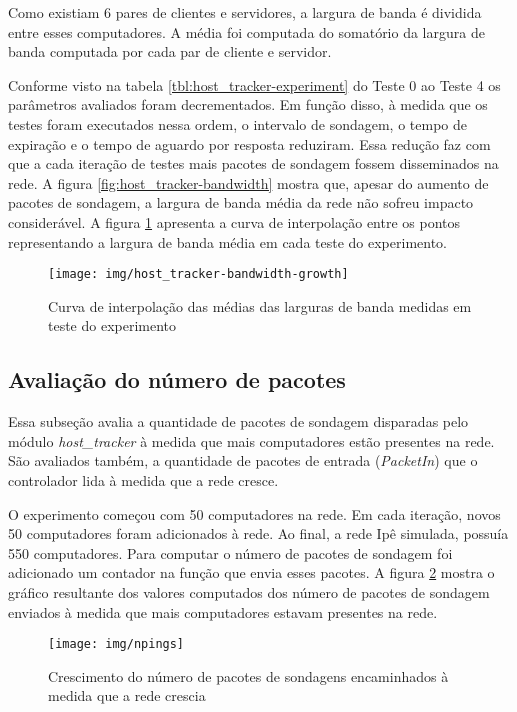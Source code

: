 Como existiam 6 pares de clientes e servidores, a largura de banda é 
dividida entre esses computadores.
A média foi computada do somatório da largura de banda computada por cada 
par de cliente e servidor.

Conforme visto na tabela \ref{tbl:host_tracker-experiment} do Teste 0 ao 
Teste 4 os parâmetros avaliados foram decrementados. 
Em função disso, à medida que os testes foram executados nessa ordem, 
o intervalo de sondagem, o tempo de expiração e o tempo de aguardo por 
resposta reduziram. 
Essa redução faz com que a cada iteração de testes mais pacotes de sondagem
fossem disseminados na rede.
A figura \ref{fig:host_tracker-bandwidth} mostra que, apesar do aumento de 
pacotes de sondagem, a largura de banda média da rede não sofreu impacto 
considerável.
A figura \ref{fig:host_tracker-bandwidth-growth} apresenta a curva de 
interpolação entre os pontos representando a largura de banda média em cada 
teste do experimento.

\begin{figure}[!htb]
    \centering
    \label{fig:host_tracker-bandwidth-growth}
    \texttt{[image: img/host\_tracker-bandwidth-growth]}
    \caption{Curva de interpolação das médias das larguras de banda medidas 
    em teste do experimento}
\end{figure}

\subsection{Avaliação do número de pacotes}

Essa subseção avalia a quantidade de pacotes de sondagem disparadas pelo 
módulo \emph{host\_tracker} à medida que mais computadores estão presentes
na rede.
São avaliados também, a quantidade de pacotes de entrada (\emph{PacketIn}) 
que o controlador lida à medida que a rede cresce.

O experimento começou com 50 computadores na rede.
Em cada iteração, novos 50 computadores foram adicionados à rede.
Ao final, a rede Ipê simulada, possuía 550 computadores.
Para computar o número de pacotes de sondagem foi adicionado um contador 
na função que envia esses pacotes.
A figura \ref{fig:npings} mostra o gráfico resultante dos valores computados
dos número de pacotes de sondagem enviados à medida que mais computadores 
estavam presentes na rede.

\begin{figure}[!htb]
    \centering
    \label{fig:npings}
    \texttt{[image: img/npings]}
    \caption{Crescimento do número de pacotes de sondagens encaminhados 
        à medida que a rede crescia}
\end{figure}


